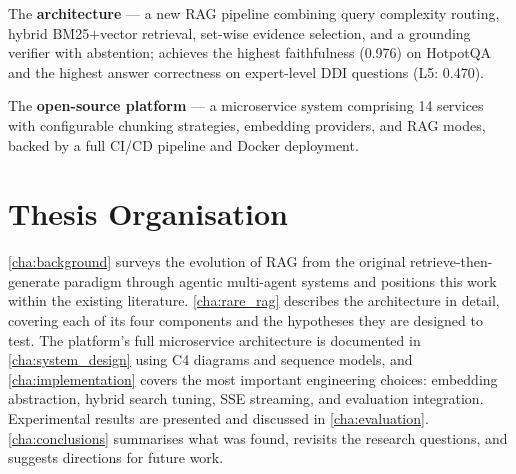 The \textbf{\rarerag{} architecture} --- a new RAG pipeline combining query complexity
routing, hybrid BM25+vector retrieval, set-wise evidence selection, and a grounding
verifier with abstention; \rarerag{} achieves the highest faithfulness (0.976) on
HotpotQA and the highest answer correctness on expert-level DDI questions (L5: 0.470).

The \textbf{open-source \medrag{} platform} --- a microservice system comprising
14 services with configurable chunking strategies, embedding providers, and RAG modes,
backed by a full CI/CD pipeline and Docker deployment.

\section{Thesis Organisation}
\label{sec:organisation}

\cref{cha:background} surveys the evolution of RAG from the original
retrieve-then-generate paradigm through agentic multi-agent systems and positions
this work within the existing literature.
\cref{cha:rare_rag} describes the \rarerag{} architecture in detail, covering
each of its four components and the hypotheses they are designed to test.
The \medrag{} platform's full microservice architecture is documented in
\cref{cha:system_design} using C4 diagrams and sequence models, and
\cref{cha:implementation} covers the most important engineering choices:
embedding abstraction, hybrid search tuning, SSE streaming, and evaluation integration.
Experimental results are presented and discussed in \cref{cha:evaluation}.
\cref{cha:conclusions} summarises what was found, revisits the research questions,
and suggests directions for future work.
